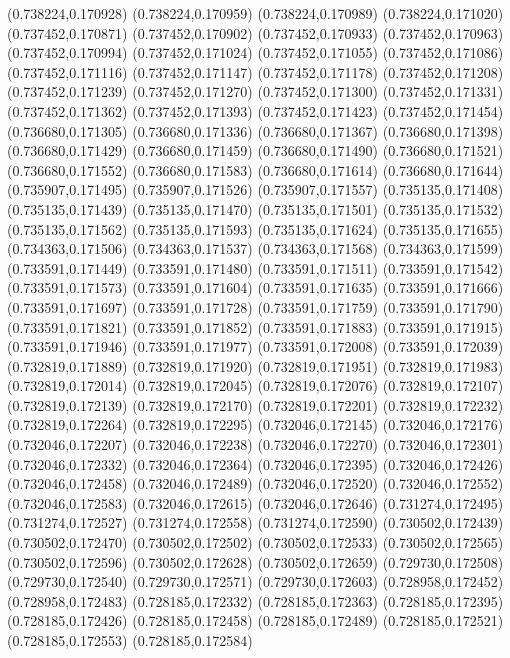(0.738224,0.170928)
(0.738224,0.170959)
(0.738224,0.170989)
(0.738224,0.171020)
(0.737452,0.170871)
(0.737452,0.170902)
(0.737452,0.170933)
(0.737452,0.170963)
(0.737452,0.170994)
(0.737452,0.171024)
(0.737452,0.171055)
(0.737452,0.171086)
(0.737452,0.171116)
(0.737452,0.171147)
(0.737452,0.171178)
(0.737452,0.171208)
(0.737452,0.171239)
(0.737452,0.171270)
(0.737452,0.171300)
(0.737452,0.171331)
(0.737452,0.171362)
(0.737452,0.171393)
(0.737452,0.171423)
(0.737452,0.171454)
(0.736680,0.171305)
(0.736680,0.171336)
(0.736680,0.171367)
(0.736680,0.171398)
(0.736680,0.171429)
(0.736680,0.171459)
(0.736680,0.171490)
(0.736680,0.171521)
(0.736680,0.171552)
(0.736680,0.171583)
(0.736680,0.171614)
(0.736680,0.171644)
(0.735907,0.171495)
(0.735907,0.171526)
(0.735907,0.171557)
(0.735135,0.171408)
(0.735135,0.171439)
(0.735135,0.171470)
(0.735135,0.171501)
(0.735135,0.171532)
(0.735135,0.171562)
(0.735135,0.171593)
(0.735135,0.171624)
(0.735135,0.171655)
(0.734363,0.171506)
(0.734363,0.171537)
(0.734363,0.171568)
(0.734363,0.171599)
(0.733591,0.171449)
(0.733591,0.171480)
(0.733591,0.171511)
(0.733591,0.171542)
(0.733591,0.171573)
(0.733591,0.171604)
(0.733591,0.171635)
(0.733591,0.171666)
(0.733591,0.171697)
(0.733591,0.171728)
(0.733591,0.171759)
(0.733591,0.171790)
(0.733591,0.171821)
(0.733591,0.171852)
(0.733591,0.171883)
(0.733591,0.171915)
(0.733591,0.171946)
(0.733591,0.171977)
(0.733591,0.172008)
(0.733591,0.172039)
(0.732819,0.171889)
(0.732819,0.171920)
(0.732819,0.171951)
(0.732819,0.171983)
(0.732819,0.172014)
(0.732819,0.172045)
(0.732819,0.172076)
(0.732819,0.172107)
(0.732819,0.172139)
(0.732819,0.172170)
(0.732819,0.172201)
(0.732819,0.172232)
(0.732819,0.172264)
(0.732819,0.172295)
(0.732046,0.172145)
(0.732046,0.172176)
(0.732046,0.172207)
(0.732046,0.172238)
(0.732046,0.172270)
(0.732046,0.172301)
(0.732046,0.172332)
(0.732046,0.172364)
(0.732046,0.172395)
(0.732046,0.172426)
(0.732046,0.172458)
(0.732046,0.172489)
(0.732046,0.172520)
(0.732046,0.172552)
(0.732046,0.172583)
(0.732046,0.172615)
(0.732046,0.172646)
(0.731274,0.172495)
(0.731274,0.172527)
(0.731274,0.172558)
(0.731274,0.172590)
(0.730502,0.172439)
(0.730502,0.172470)
(0.730502,0.172502)
(0.730502,0.172533)
(0.730502,0.172565)
(0.730502,0.172596)
(0.730502,0.172628)
(0.730502,0.172659)
(0.729730,0.172508)
(0.729730,0.172540)
(0.729730,0.172571)
(0.729730,0.172603)
(0.728958,0.172452)
(0.728958,0.172483)
(0.728185,0.172332)
(0.728185,0.172363)
(0.728185,0.172395)
(0.728185,0.172426)
(0.728185,0.172458)
(0.728185,0.172489)
(0.728185,0.172521)
(0.728185,0.172553)
(0.728185,0.172584)
